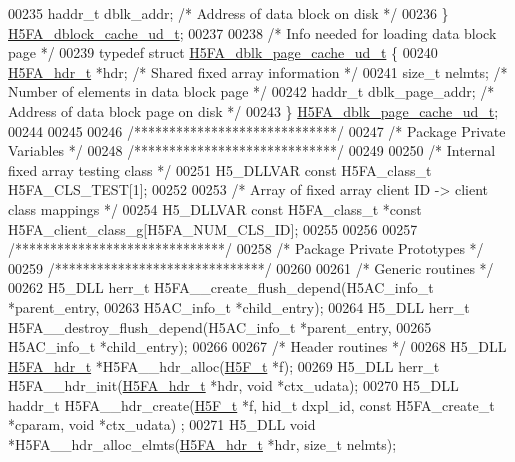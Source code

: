\begin{DoxyCode}
00235     haddr\_t     dblk\_addr;      \textcolor{comment}{/* Address of data block on disk        */}
00236 \} \hyperlink{struct_h5_f_a__dblock__cache__ud__t}{H5FA\_dblock\_cache\_ud\_t};
00237 
00238 \textcolor{comment}{/* Info needed for loading data block page */}
00239 \textcolor{keyword}{typedef} \textcolor{keyword}{struct }\hyperlink{struct_h5_f_a__dblk__page__cache__ud__t}{H5FA\_dblk\_page\_cache\_ud\_t} \{
00240     \hyperlink{struct_h5_f_a__hdr__t}{H5FA\_hdr\_t} *hdr;            \textcolor{comment}{/* Shared fixed array information           */}
00241     \textcolor{keywordtype}{size\_t} nelmts;              \textcolor{comment}{/* Number of elements in data block page    */}
00242     haddr\_t     dblk\_page\_addr; \textcolor{comment}{/* Address of data block page on disk */}
00243 \} \hyperlink{struct_h5_f_a__dblk__page__cache__ud__t}{H5FA\_dblk\_page\_cache\_ud\_t};
00244 
00245 
00246 \textcolor{comment}{/*****************************/}
00247 \textcolor{comment}{/* Package Private Variables */}
00248 \textcolor{comment}{/*****************************/}
00249 
00250 \textcolor{comment}{/* Internal fixed array testing class */}
00251 H5\_DLLVAR \textcolor{keyword}{const} H5FA\_class\_t H5FA\_CLS\_TEST[1];
00252 
00253 \textcolor{comment}{/* Array of fixed array client ID -> client class mappings */}
00254 H5\_DLLVAR \textcolor{keyword}{const} H5FA\_class\_t *\textcolor{keyword}{const} H5FA\_client\_class\_g[H5FA\_NUM\_CLS\_ID];
00255 
00256 
00257 \textcolor{comment}{/******************************/}
00258 \textcolor{comment}{/* Package Private Prototypes */}
00259 \textcolor{comment}{/******************************/}
00260 
00261 \textcolor{comment}{/* Generic routines */}
00262 H5\_DLL herr\_t H5FA\_\_create\_flush\_depend(H5AC\_info\_t *parent\_entry,
00263     H5AC\_info\_t *child\_entry);
00264 H5\_DLL herr\_t H5FA\_\_destroy\_flush\_depend(H5AC\_info\_t *parent\_entry,
00265     H5AC\_info\_t *child\_entry);
00266 
00267 \textcolor{comment}{/* Header routines */}
00268 H5\_DLL \hyperlink{struct_h5_f_a__hdr__t}{H5FA\_hdr\_t} *H5FA\_\_hdr\_alloc(\hyperlink{struct_h5_f__t}{H5F\_t} *f);
00269 H5\_DLL herr\_t H5FA\_\_hdr\_init(\hyperlink{struct_h5_f_a__hdr__t}{H5FA\_hdr\_t} *hdr, \textcolor{keywordtype}{void} *ctx\_udata);
00270 H5\_DLL haddr\_t H5FA\_\_hdr\_create(\hyperlink{struct_h5_f__t}{H5F\_t} *f, hid\_t dxpl\_id, \textcolor{keyword}{const} H5FA\_create\_t *cparam, \textcolor{keywordtype}{void} *ctx\_udata)
      ;
00271 H5\_DLL \textcolor{keywordtype}{void} *H5FA\_\_hdr\_alloc\_elmts(\hyperlink{struct_h5_f_a__hdr__t}{H5FA\_hdr\_t} *hdr, \textcolor{keywordtype}{size\_t} nelmts);

\end{DoxyCode}
